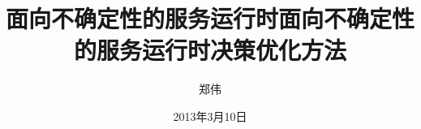 
\subject{计算机科学与技术}
\author{郑伟}
\date{2013年3月10日}

\ifxueweidoctor
  \title{面向不确定性的服务运行时} %
\fi
\ifxueweimaster
  \title{面向不确定性的服务运行时决策优化方法}
\fi

\makecover
\clearpage
\setcounter{page}{1}